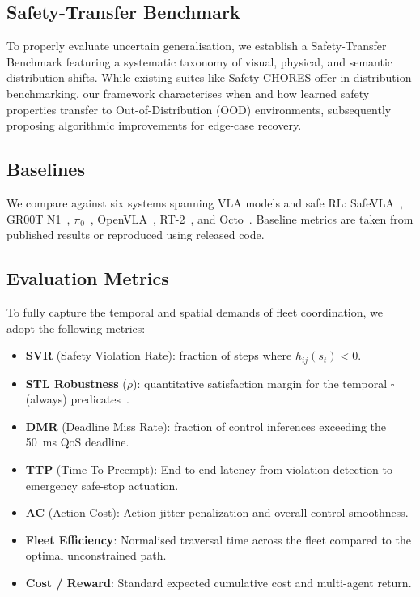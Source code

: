 \documentclass[10pt,twocolumn]{article}
\begin{document}
\subsection{Safety-Transfer Benchmark}
To properly evaluate uncertain generalisation, we establish a Safety-Transfer Benchmark featuring a systematic taxonomy of visual, physical, and semantic distribution shifts. While existing suites like Safety-CHORES offer in-distribution benchmarking, our framework characterises when and how learned safety properties transfer to Out-of-Distribution (OOD) environments, subsequently proposing algorithmic improvements for edge-case recovery.

\subsection{Baselines}
We compare against six systems spanning VLA models and safe RL:
SafeVLA~\cite{safevla2025},
GR00T N1~\cite{groot2025},
$\pi_0$~\cite{pi0_2025},
OpenVLA~\cite{openvla2024},
RT-2~\cite{richter2023rt2},
and Octo~\cite{octo2024}.
Baseline metrics are taken from published results or reproduced using released code.

\subsection{Evaluation Metrics}
To fully capture the temporal and spatial demands of fleet coordination, we adopt the following metrics:
\begin{itemize}
    \item \textbf{SVR} (Safety Violation Rate): fraction of steps where $h_{ij}(s_t) < 0$.
    \item \textbf{STL Robustness} ($\rho$): quantitative satisfaction margin for the temporal $\square$ (always) predicates~\cite{donze2010stl}.
    \item \textbf{DMR} (Deadline Miss Rate): fraction of control inferences exceeding the \SI{50}{\milli\second} QoS deadline.
    \item \textbf{TTP} (Time-To-Preempt): End-to-end latency from violation detection to emergency safe-stop actuation.
    \item \textbf{AC} (Action Cost): Action jitter penalization and overall control smoothness.
    \item \textbf{Fleet Efficiency}: Normalised traversal time across the fleet compared to the optimal unconstrained path.
    \item \textbf{Cost / Reward}: Standard expected cumulative cost and multi-agent return.
\end{itemize}
\end{document}

